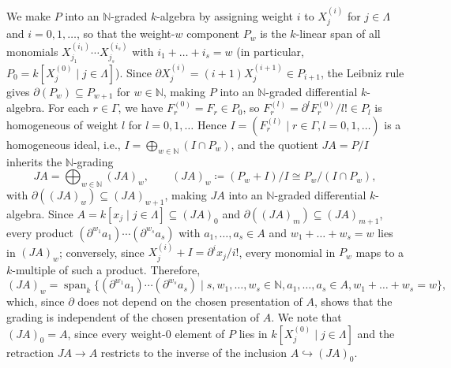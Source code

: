 \documentclass[a4paper, 12pt, reqno]{amsart}
\theoremstyle{remark}
\begin{document}
We make $P$ into an $\mathbb{N}$-graded $k$-algebra by assigning weight $i$ to $X_j^{(i)}$ for $j \in \Lambda$ and $i = 0, 1, \dots$,
so that the weight-$w$ component $P_w$ is the $k$-linear span of all monomials $X_{j_1}^{(i_1)} \cdots X_{j_s}^{(i_s)}$ with $i_1 + \dots + i_s = w$
(in particular, $P_0 = k[X_j^{(0)} \mid j \in \Lambda]$).
Since $\partial X_j^{(i)} = (i + 1)X_j^{(i + 1)} \in P_{i + 1}$,
the Leibniz rule gives $\partial(P_w) \subseteq P_{w + 1}$ for $w \in \mathbb{N}$,
making $P$ into an $\mathbb{N}$-graded differential $k$-algebra.
For each $r \in \Gamma$, we have $F_r^{(0)} = F_r \in P_0$,
so $F_r^{(l)} = \partial^l F_r^{(0)} / l! \in P_l$ is homogeneous of weight $l$ for $l = 0, 1, \dots$
Hence $I = (F_r^{(l)} \mid r \in \Gamma, l = 0, 1, \dots)$ is a homogeneous ideal, i.e., $I = \bigoplus_{w \in \mathbb{N}}(I \cap P_w)$,
and the quotient $J A = P / I$ inherits the $\mathbb{N}$-grading
\begin{equation*}
  J A = \bigoplus_{w \in \mathbb{N}}(J A)_w, \qquad (J A)_w \coloneq (P_w + I) / I \cong P_w / (I \cap P_w),
\end{equation*}
with $\partial((J A)_w) \subseteq (J A)_{w + 1}$,
making $J A$ into an $\mathbb{N}$-graded differential $k$-algebra.
Since $A = k[x_j \mid j \in \Lambda] \subseteq (J A)_0$ and $\partial((J A)_m) \subseteq (J A)_{m + 1}$,
every product $(\partial^{w_1}a_1)\cdots(\partial^{w_s}a_s)$ with $a_1, \dots, a_s \in A$ and $w_1 + \dots + w_s = w$ lies in $(J A)_w$;
conversely, since $X_j^{(i)} + I = \partial^i x_j / i!$,
every monomial in $P_w$ maps to a $k$-multiple of such a product.
Therefore,
\begin{equation}
  \label{eq:jet-grading}
  (J A)_w = \operatorname{span}_k\{(\partial^{w_1}a_1)\cdots(\partial^{w_s}a_s) \mid s, w_1, \dots, w_s \in \mathbb{N}, a_1, \dots, a_s \in A, w_1 + \dots + w_s = w\},
\end{equation}
which, since $\partial$ does not depend on the chosen presentation of $A$, shows that the grading is independent of the chosen presentation of $A$.
We note that $(J A)_0 = A$, since every weight-$0$ element of $P$ lies in $k[X_j^{(0)} \mid j \in \Lambda]$ and the retraction $J A \to A$ restricts to the inverse of the inclusion $A \hookrightarrow (J A)_0$.
\end{document}
